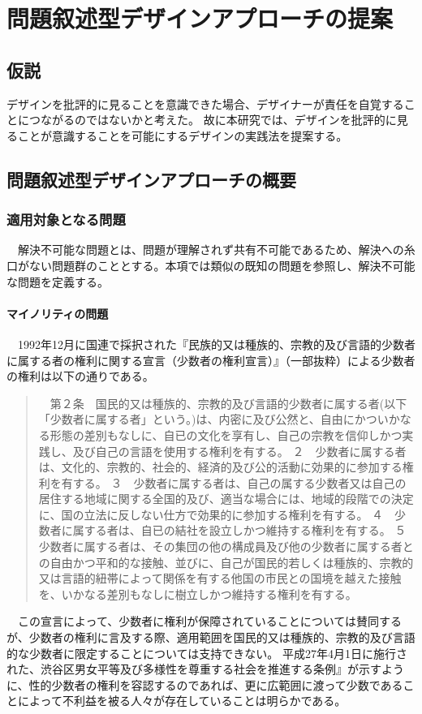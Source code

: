 \documentclass{jsarticle}
\begin{document}
\newpage

\section{問題叙述型デザインアプローチの提案}

\subsection{仮説}


デザインを批評的に見ることを意識できた場合、デザイナーが責任を自覚することにつながるのではないかと考えた。
故に本研究では、デザインを批評的に見ることが意識することを可能にするデザインの実践法を提案する。

\newpage
\subsection{問題叙述型デザインアプローチの概要}

\subsubsection{適用対象となる問題}

　解決不可能な問題とは、問題が理解されず共有不可能であるため、解決への糸口がない問題群のこととする。本項では類似の既知の問題を参照し、解決不可能な問題を定義する。

\paragraph*{マイノリティの問題}
　1992年12月に国連で採択された『民族的又は種族的、宗教的及び言語的少数者に属する者の権利に関する宣言（少数者の権利宣言）』\cite{minorities}（一部抜粋）による少数者の権利は以下の通りである。

\begin{quotation}
　第２条　国民的又は種族的、宗教的及び言語的少数者に属する者(以下「少数者に属する者」という。)は、内密に及び公然と、自由にかついかなる形態の差別もなしに、自已の文化を享有し、自己の宗教を信仰しかつ実践し、及び自己の言語を使用する権利を有する。
２　少数者に属する者は、文化的、宗教的、社会的、経済的及び公的活動に効果的に参加する権利を有する。
３　少数者に属する者は、自己の属する少数者又は自己の居住する地域に関する全国的及び、適当な場合には、地域的段階での決定に、国の立法に反しない仕方で効果的に参加する権利を有する。
４　少数者に属する者は、自已の結社を設立しかつ維持する権利を有する。
５　少数者に属する者は、その集団の他の構成員及び他の少数者に属する者との自由かつ平和的な接触、並びに、自己が国民的若しくは種族的、宗教的又は言語的紐帯によって関係を有する他国の市民との国境を越えた接触を、いかなる差別もなしに樹立しかつ維持する権利を有する。
\end{quotation}
　この宣言によって、少数者に権利が保障されていることについては賛同するが、少数者の権利に言及する際、適用範囲を国民的又は種族的、宗教的及び言語的な少数者に限定することについては支持できない。
平成27年4月1日に施行された、渋谷区男女平等及び多様性を尊重する社会を推進する条例』\cite{shibuya}が示すように、性的少数者の権利を容認するのであれば、更に広範囲に渡って少数であることによって不利益を被る人々が存在していることは明らかである。
\end{document}
